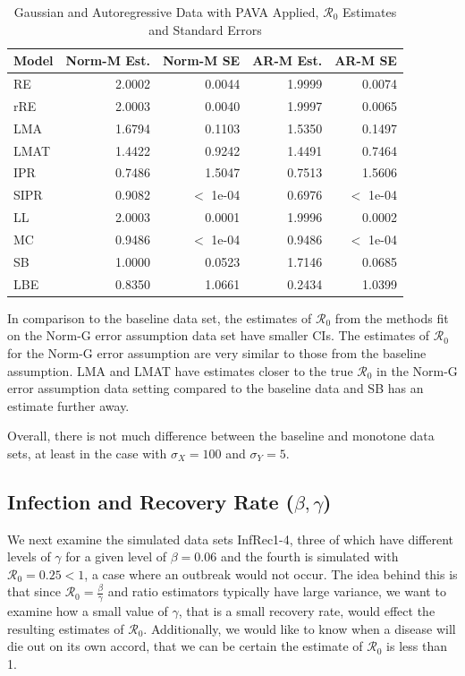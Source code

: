 \documentclass[12pt]{article}
\newcommand{\rr}{\ensuremath{\mathcal{R}_0}}
\begin{document}
\begin{table}[H]
	
	\centering
	\begin{tabular}[t]{l|r|r|r|r}
		\hline
		Model & Norm-M Est. & Norm-M SE & AR-M Est. & AR-M SE\\
		\hline
		RE & 2.0002 & 0.0044 & 1.9999 & 0.0074\\
		\hline
		rRE & 2.0003 & 0.0040 & 1.9997 & 0.0065\\
		\hline
		LMA & 1.6794 & 0.1103 & 1.5350 & 0.1497\\
		\hline
		LMAT & 1.4422 & 0.9242 & 1.4491 & 0.7464\\
		\hline
		IPR & 0.7486 & 1.5047 & 0.7513 & 1.5606\\
		\hline
		SIPR & 0.9082 & $<$ 1e-04 & 0.6976 & $<$ 1e-04\\
		\hline
		LL & 2.0003 & 0.0001 & 1.9996 & 0.0002\\
		\hline
		MC & 0.9486 & $<$ 1e-04 & 0.9486 & $<$ 1e-04\\
		\hline
		SB & 1.0000 & 0.0523 & 1.7146 & 0.0685\\
		\hline
		LBE & 0.8350 & 1.0661 & 0.2434 & 1.0399\\
		\hline
	\end{tabular}
\caption{Gaussian and Autoregressive Data with PAVA Applied, $\rr$ Estimates and Standard Errors}\label{tab:pava-res}
\end{table}

In comparison to the baseline data set, the estimates of $\rr$ from the methods fit on the Norm-G error assumption data set have smaller CIs.  The estimates of $\rr$ for the Norm-G error assumption are very similar to those from the baseline assumption.  LMA and LMAT have estimates closer to the true $\rr$ in the Norm-G error assumption data setting compared to the baseline data and SB has an estimate further away.

Overall, there is not much difference between the baseline and monotone data sets, at least in the case with $\sigma_X=100$ and $\sigma_Y=5$.  

\subsection{Infection and Recovery Rate ($\beta, \gamma$)}\label{sec:res-beta-gamma}

We next examine the simulated data sets InfRec1-4, three of which have different levels of $\gamma$ for a given level of $\beta = 0.06$ and the fourth is simulated with $\rr=0.25 < 1$, a case where an outbreak would not occur.  The idea behind this is that since $\rr=\frac{\beta}{\gamma}$ and ratio estimators typically have large variance, we want to examine how a small value of $\gamma$, that is a small recovery rate, would effect the resulting estimates of $\rr$.  Additionally, we would like to know when a disease will die out on its own accord, that we can be certain the estimate of $\rr$ is less than 1.
\end{document}
